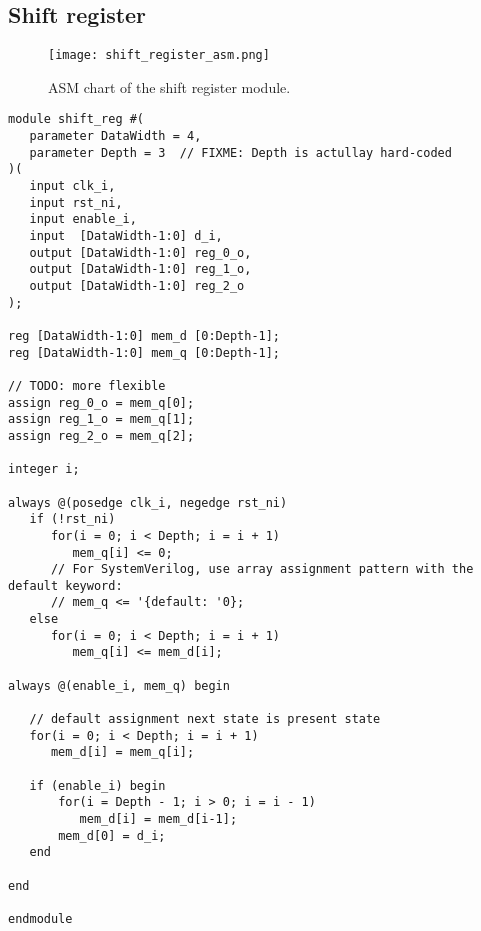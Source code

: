 \subsection{Shift register}

\begin{figure}[htbp]
   \centering
   \texttt{[image: shift\_register\_asm.png]}
   \caption{ASM chart of the shift register module.}
   \label{fig:shift_register_asm}
\end{figure}

\begin{verbatim}
module shift_reg #(
   parameter DataWidth = 4,
   parameter Depth = 3  // FIXME: Depth is actullay hard-coded
)(
   input clk_i,
   input rst_ni,
   input enable_i,
   input  [DataWidth-1:0] d_i,
   output [DataWidth-1:0] reg_0_o,
   output [DataWidth-1:0] reg_1_o,
   output [DataWidth-1:0] reg_2_o
);

reg [DataWidth-1:0] mem_d [0:Depth-1];
reg [DataWidth-1:0] mem_q [0:Depth-1];

// TODO: more flexible
assign reg_0_o = mem_q[0];
assign reg_1_o = mem_q[1];
assign reg_2_o = mem_q[2];

integer i;

always @(posedge clk_i, negedge rst_ni)
   if (!rst_ni)
      for(i = 0; i < Depth; i = i + 1)
         mem_q[i] <= 0;
      // For SystemVerilog, use array assignment pattern with the default keyword:
      // mem_q <= '{default: '0};
   else
      for(i = 0; i < Depth; i = i + 1)
         mem_q[i] <= mem_d[i];

always @(enable_i, mem_q) begin

   // default assignment next state is present state
   for(i = 0; i < Depth; i = i + 1)
      mem_d[i] = mem_q[i];

   if (enable_i) begin
       for(i = Depth - 1; i > 0; i = i - 1)
          mem_d[i] = mem_d[i-1];
       mem_d[0] = d_i;
   end

end

endmodule
\end{verbatim}

